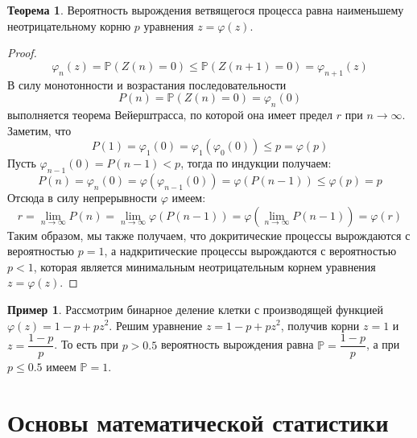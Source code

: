 \documentclass[12pt]{article}
\theoremstyle{definition}
\newtheorem{theorem}{Теорема}[section]
\newtheorem*{example}{Пример}
\newcommand{\prob}{\mathbb{P}}
\begin{document}
\begin{theorem}
    Вероятность вырождения ветвящегося процесса равна наименьшему неотрицательному корню $p$ уравнения $z=\varphi(z)$.
\end{theorem}
\begin{proof}
    $$\varphi_n(z)=\prob(Z(n)=0)\leq \prob(Z(n+1)=0)=\varphi_{n+1}(z)$$
    В силу монотонности и возрастания последовательности
    $$P(n)=\prob(Z(n)=0)=\varphi_n(0)$$
    выполняется теорема Вейерштрасса, по которой она имеет предел $r$ при $n\to\infty$. Заметим, что 
    $$P(1)=\varphi_1(0)=\varphi_1(\varphi_0(0))\leq p=\varphi(p)$$
    Пусть $\varphi_{n-1}(0)=P(n-1)<p$, тогда по индукции получаем:
    $$P(n)=\varphi_n(0)=\varphi(\varphi_{n-1}(0))=\varphi(P(n-1))\leq \varphi(p)=p$$
    Отсюда в силу непрерывности $\varphi$ имеем:
    $$r=\lim_{n\to\infty}P(n)=\lim_{n\to\infty}\varphi(P(n-1))=\varphi\left(\lim_{n\to\infty}P(n-1)\right)=\varphi(r)$$
    Таким образом, мы также получаем, что докритические процессы вырождаются с вероятностью $p=1$, а надкритические процессы вырождаются с вероятностью $p<1$, которая является минимальным неотрицательным корнем уравнения $z=\varphi(z)$.
\end{proof}
\begin{example}
    Рассмотрим бинарное деление клетки с производящей функцией $\varphi(z)=1-p+pz^2$. Решим уравнение $z=1-p+pz^2$, получив корни $z=1$ и $z=\dfrac{1-p}{p}$. То есть при $p>\num{0.5}$ вероятность вырождения равна $\prob=\dfrac{1-p}{p}$, а при $p\leq\num{0.5}$ имеем $\prob=1$.
\end{example}

\section{Основы математической статистики}
\end{document}
